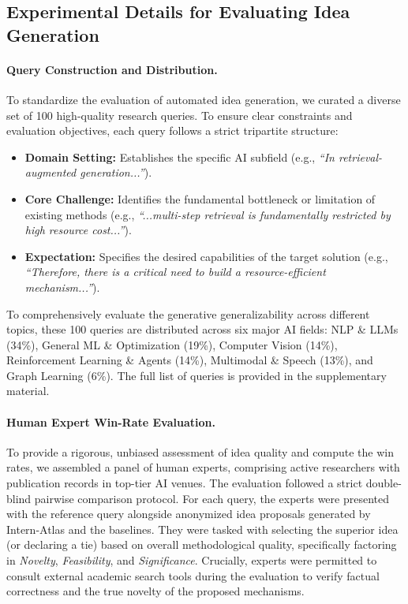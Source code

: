 \documentclass{opendatalab}
\begin{document}
\subsection{Experimental Details for Evaluating Idea Generation}
\label{app:idea-gen-queries}

\paragraph{Query Construction and Distribution.}
To standardize the evaluation of automated idea generation, we curated a diverse set of 100 high-quality research queries. To ensure clear constraints and evaluation objectives, each query follows a strict tripartite structure:
\begin{itemize}
\item \textbf{Domain Setting:} Establishes the specific AI subfield (e.g., \emph{``In retrieval-augmented generation...''}).
\item \textbf{Core Challenge:} Identifies the fundamental bottleneck or limitation of existing methods (e.g., \emph{``...multi-step retrieval is fundamentally restricted by high resource cost...''}).
\item \textbf{Expectation:} Specifies the desired capabilities of the target solution (e.g., \emph{``Therefore, there is a critical need to build a resource-efficient mechanism...''}).
\end{itemize}
To comprehensively evaluate the generative generalizability across different topics, these 100 queries are distributed across six major AI fields: NLP \& LLMs (34\%), General ML \& Optimization (19\%), Computer Vision (14\%), Reinforcement Learning \& Agents (14\%), Multimodal \& Speech (13\%), and Graph Learning (6\%). The full list of queries is provided in the supplementary material.

\paragraph{Human Expert Win-Rate Evaluation.}
To provide a rigorous, unbiased assessment of idea quality and compute the win rates, we assembled a panel of human experts, comprising active researchers with publication records in top-tier AI venues. The evaluation followed a strict double-blind pairwise comparison protocol. For each query, the experts were presented with the reference query alongside anonymized idea proposals generated by Intern-Atlas and the baselines. They were tasked with selecting the superior idea (or declaring a tie) based on overall methodological quality, specifically factoring in \emph{Novelty}, \emph{Feasibility}, and \emph{Significance}. Crucially, experts were permitted to consult external academic search tools during the evaluation to verify factual correctness and the true novelty of the proposed mechanisms.
\end{document}
